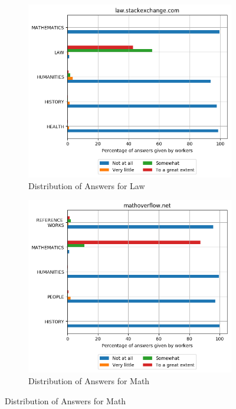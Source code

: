  \begin{figure}[H]
 \ContinuedFloat
    \centering
    \begin{subfigure}{0.5\textwidth}
    \centering
        \includegraphics[width=1\linewidth]{imgs/crowd-results/law_stackexchange_com}
        \caption{Distribution of Answers for Law}
        \label{fig:crowd-law}
    \end{subfigure}%
    \begin{subfigure}{0.5\textwidth}
    \centering
        \includegraphics[width=1\linewidth]{imgs/crowd-results/mathoverflow_net}
        \caption{Distribution of Answers for Math}
        \label{fig:crowd-math}
    \end{subfigure}
 

\end{figure}

